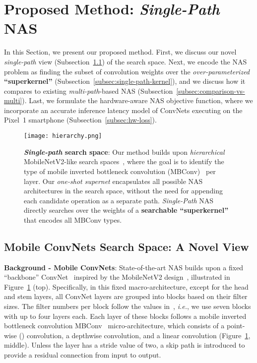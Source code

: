\documentclass[runningheads]{llncs}
\begin{document}
\section{Proposed Method: \textit{Single-Path} NAS}

In this Section, we present our proposed 
method. First, we discuss our novel \textit{single-path} view 
(Subsection~\ref{subsec:view}) of the search space. Next, 
we encode the NAS problem as finding the 
subset of convolution weights over the \textit{over-parameterized} 
\textbf{``superkernel''} (Subsection~\ref{subsec:single-path-kernel}), and we discuss 
how it compares to existing \textit{multi-path}-based NAS 
(Subsection~\ref{subsec:comparison-vs-multi}). Last, we formulate 
the hardware-aware NAS objective function, where we incorporate 
an accurate inference latency model of ConvNets executing on the
Pixel~1 smartphone (Subsection~\ref{subsec:hw-loss}).


\begin{figure}[ht!]
  \centering
  \texttt{[image: hierarchy.png]}
  \caption{\textbf{\textit{Single-path} search space}: Our method builds upon
  \textit{hierarchical} MobileNetV2-like search 
  spaces~\cite{sandler2018mobilenetv2,tan2018mnasnet}, where the goal
  is to identify the type of mobile inverted bottleneck 
  convolution (MBConv)~\cite{sandler2018mobilenetv2} per layer.
  Our \textit{one-shot supernet} encapsulates all possible NAS architectures 
  in the search space, without the need for appending each candidate operation
  as a separate path. \textit{Single-Path} NAS directly searches over the weights of 
  a \textbf{searchable ``superkernel''} that encodes all MBConv types.}
  \label{fig:design_space}
\end{figure}


\subsection{Mobile ConvNets Search Space: A Novel View}
\label{subsec:view}

\textbf{Background - Mobile ConvNets}: State-of-the-art  
NAS builds upon a fixed ``backbone'' ConvNet~\cite{cai2018proxylessnas} inspired 
by the MobileNetV2 design~\cite{sandler2018mobilenetv2}, illustrated in 
Figure~\ref{fig:design_space} (top). Specifically, in this fixed macro-architecture, 
except for the head and stem layers, all ConvNet layers are grouped into 
blocks based on their filter sizes. The filter numbers per block 
follow the values in~\cite{wu2018fbnet}, \textit{i.e.}, we use 
seven blocks with up to four layers each. Each layer of these blocks 
follows a mobile inverted bottleneck convolution MBConv~\cite{sandler2018mobilenetv2}
micro-architecture, which consists of a point-wise () convolution, a  
depthwise convolution, and a linear  convolution (Figure~\ref{fig:design_space}, middle). 
Unless the layer has a stride 
value of two, a skip path is introduced to provide a residual 
connection from input to output. 
\end{document}
